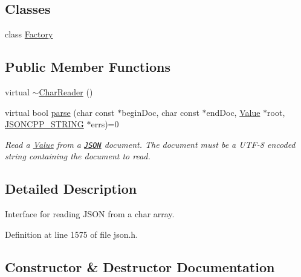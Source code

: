 \subsection*{Classes}
\begin{DoxyCompactItemize}
\item 
class \hyperlink{class_json_1_1_char_reader_1_1_factory}{Factory}
\end{DoxyCompactItemize}
\subsection*{Public Member Functions}
\begin{DoxyCompactItemize}
\item 
virtual \hyperlink{class_json_1_1_char_reader_acaa7b6ad04fe1cf2ddfca06e66550d7e}{$\sim$\+Char\+Reader} ()
\item 
virtual bool \hyperlink{class_json_1_1_char_reader_a7983680d50fd0745f371c43b162e78e1}{parse} (char const $\ast$begin\+Doc, char const $\ast$end\+Doc, \hyperlink{class_json_1_1_value}{Value} $\ast$root, \hyperlink{json_8h_a1e723f95759de062585bc4a8fd3fa4be}{J\+S\+O\+N\+C\+P\+P\+\_\+\+S\+T\+R\+I\+NG} $\ast$errs)=0
\begin{DoxyCompactList}\small\item\em Read a \hyperlink{class_json_1_1_value}{Value} from a \href{http://www.json.org}{\tt J\+S\+ON} document. The document must be a U\+T\+F-\/8 encoded string containing the document to read. \end{DoxyCompactList}\end{DoxyCompactItemize}


\subsection{Detailed Description}
Interface for reading J\+S\+ON from a char array. 

Definition at line 1575 of file json.\+h.



\subsection{Constructor \& Destructor Documentation}
\mbox{\label{class_json_1_1_char_reader_acaa7b6ad04fe1cf2ddfca06e66550d7e}} 
